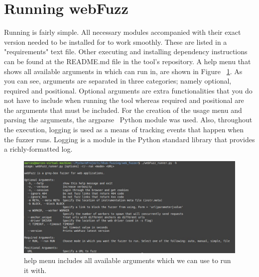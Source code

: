 \section{Running webFuzz}
Running \pname{} is fairly simple. All necessary modules accompanied with their exact version needed to be installed for \pname{} to work smoothly. These are listed in a "requirements" text file. Other executing and installing dependency instructions can be found at the README.md file in the tool's repository. A help menu that shows all available arguments in which \pname{} can run in, are shown in Figure ~\ref{fig:argparser_menu}. As you can see, arguments are separated in three categories; namely optional, required and positional. Optional arguments are extra functionalities that you do not have to include when running the tool whereas required and positional are the arguments that must be included. For the creation of the usage menu and parsing the arguments, the argparse~\cite{argparse} Python module was used.
Also, throughout the execution, logging is used as a means of tracking events that happen when the fuzzer runs. Logging is a module in the Python standard library that provides a richly-formatted log.

\begin{figure}[ht]
 \centering
 \captionsetup{justification=centering}
 \includegraphics[width=\linewidth]{figures/argparser_menu.jpg}
 \caption{\pname{} help menu includes all available arguments which we can use to run it with.}
 \label{fig:argparser_menu}
\end{figure}
